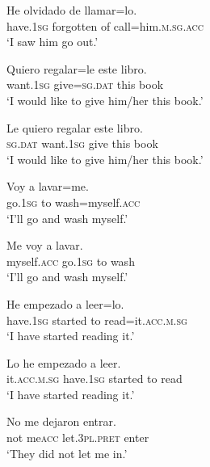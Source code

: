 \documentclass[output=paper,modfonts,nonflat,newtxmath]{langsci/langscibook}
\begin{document}
\ea \label{ex:sciutti:22}
    \gll He olvidado de llamar=lo.\\
         have.\textsc{1sg} forgotten of call=him.\textsc{m.sg.acc} \\
    \glt  ‘I saw him go out.’
\z

\ea \label{ex:sciutti:23}
    \begin{xlist}
    \ex \label{ex:sciutti:23a}
    \gll Quiero regalar=le este libro.\\
         want.\textsc{1sg} give=\textsc{sg.dat} this  book\\
    \glt  ‘I would like to give him/her this book.’

    \ex \label{ex:sciutti:23b}
    \gll Le quiero regalar este libro.\\
         \textsc{sg.dat} want.\textsc{1sg} give this book\\
    \glt  ‘I would like to give him/her this book.’
    \end{xlist}
\z

\ea \label{ex:sciutti:24}
    \begin{xlist}
    \ex \label{ex:sciutti:24a}
    \gll Voy a lavar=me.\\
         go.\textsc{1sg} to wash=myself.\textsc{acc}\\
    \glt  ‘I’ll go and wash myself.’

    \ex \label{ex:sciutti:24b}
    \gll Me voy a lavar.\\
         myself.\textsc{acc} go.\textsc{1sg} to wash\\
    \glt  ‘I’ll go and wash myself.’
    \end{xlist}
\z


\ea \label{ex:sciutti:25}
    \begin{xlist}
    \ex \label{ex:sciutti:25a}
    \gll He empezado a leer=lo.\\
         have.\textsc{1sg} started to read=it.\textsc{acc.m.sg}\\
    \glt  ‘I have started reading it.’

    \ex \label{ex:sciutti:25b}
    \gll Lo he empezado a leer.\\
         it.\textsc{acc.m.sg} have.\textsc{1sg} started to read\\
    \glt  ‘I have started reading it.’
    \end{xlist}
\z

\ea \label{ex:sciutti:26}
    \gll No me dejaron entrar.\\
         not me\textsc{acc} let.\textsc{3pl.pret} enter \\
    \glt  ‘They did not let me in.’
\z
\end{document}
